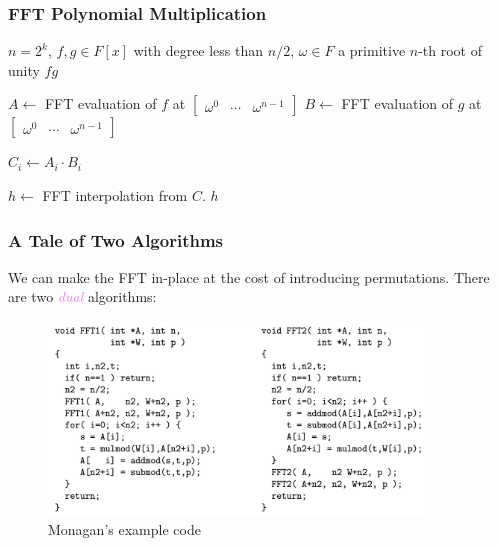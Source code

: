 \documentclass{beamer}
\newcommand{\its}[1]{\textcolor{violet}{\emph{#1}}}
\begin{document}
\begin{frame}
    \frametitle{FFT Polynomial Multiplication}

    \begin{algorithmic}
        \Require $n = 2^k$, $f,g \in F[x]$ with degree less than $n/2$,
        $\omega \in F$ a primitive $n$-th root of unity
        \Ensure $fg$
        \pause \vfill

        \State $A \gets$ FFT evaluation of $f$ at
            $\begin{bmatrix} \omega^0 & \cdots & \omega^{n - 1} \end{bmatrix}$
        \State $B \gets$ FFT evaluation of $g$ at
            $\begin{bmatrix} \omega^0 & \cdots & \omega^{n - 1} \end{bmatrix}$
        \pause \vfill

         \State $C_i \gets A_i \cdot B_i$ \EndFor
        \pause \vfill

        \State $h \gets$ FFT interpolation from $C$.
        \State \Return $h$
    \end{algorithmic}
\end{frame}

\begin{frame}
    \frametitle{A Tale of Two Algorithms}

    We can make the FFT in-place at the cost of introducing permutations. There
    are two \its{dual} algorithms:

    \begin{figure}[h]
        \centering
        \includegraphics[width=0.9\textwidth]{monagan.png}
        \caption{Monagan's example code \cite{monagan}}
    \end{figure}
\end{frame}
\end{document}
